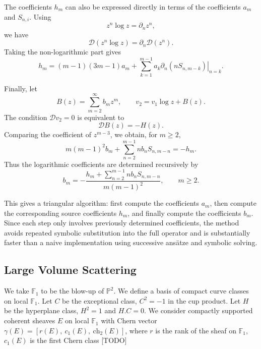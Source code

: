 \documentclass[11pt, a4paper]{article}
\numberwithin{equation}{section}
\begin{document}
The coefficients \(h_m\) can also be expressed directly in terms of the
coefficients \(a_m\) and \(S_{n,i}\). Using
\begin{equation}
  z^n \log z = \partial_n z^n,
\end{equation}
we have
\begin{equation}
  \mathcal{D}(z^n \log z)
  =
  \partial_n \mathcal{D}(z^n).
\end{equation}
Taking the non-logarithmic part gives
\begin{equation}
  h_m
  =
  (m-1)(3m-1)a_m
  +
  \sum_{k=1}^{m-1}
  a_k
  \left.
  \partial_n
  \left(
    n S_{n,m-k}
  \right)
  \right|_{n=k}.
\end{equation}

Finally, let
\begin{equation}
  B(z)
  =
  \sum_{m=2}^{\infty} b_m z^m,
  \qquad
  v_2 = v_1 \log z + B(z).
\end{equation}
The condition \(\mathcal{D}v_2=0\) is equivalent to
\begin{equation}
  \mathcal{D}B(z) = -H(z).
\end{equation}
Comparing the coefficient of \(z^{m-3}\), we obtain, for \(m\geq 2\),
\begin{equation}
  m(m-1)^2 b_m
  +
  \sum_{n=2}^{m-1}
  n b_n S_{n,m-n}
  =
  -h_m.
\end{equation}
Thus the logarithmic coefficients are determined recursively by
\begin{equation}
  b_m
  =
  -
  \frac{
    h_m
    +
    \sum_{n=2}^{m-1}
    n b_n S_{n,m-n}
  }{
    m(m-1)^2
  },
  \qquad m\geq 2.
\end{equation}

This gives a triangular algorithm: first compute the coefficients \(a_m\),
then compute the corresponding source coefficients \(h_m\), and finally compute
the coefficients \(b_m\). Since each step only involves previously determined
coefficients, the method avoids repeated symbolic substitution into the full
operator and is substantially faster than a naive implementation using
successive ansätze and symbolic solving.


\subsection{Large Volume Scattering}

We take $\mathbb{F}_1$ to be the blow-up of $\mathbb{P}^2$. We define a basis of compact curve classes on local $\mathbb{F}_1$. Let $C$ be the exceptional class, $C^2 = -1$ in the cup product. Let $H$ be the hyperplane class, $H^2 = 1$ and $H.C = 0$. We consider compactly supported coherent sheaves $E$ on local $\mathbb{F}_1$ with Chern vector $\gamma(E) = [r(E), \ c_1(E), \ \mathrm{ch}_2(E)]$, where $r$ is the rank of the sheaf on $\mathbb{F}_1$, $c_1(E)$ is the first Chern class [TODO]
\end{document}
